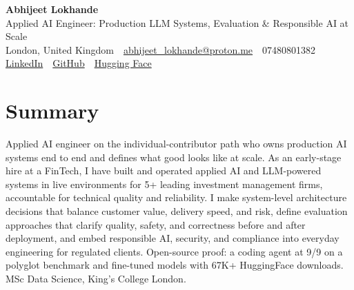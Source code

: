 \documentclass[10pt,a4paper]{article}
\newcommand{\sep}{\,\textcolor{accent!60}{\textbar}\,}
\begin{document}
\begin{center}
  {\fontsize{24}{26}\selectfont\bfseries Abhijeet Lokhande}\\[3pt]
  {\color{accent}\large Applied AI Engineer: Production LLM Systems, Evaluation \& Responsible AI at Scale}\\[5pt]
  {\small
    London, United Kingdom \sep
    \href{mailto:abhijeet_lokhande@proton.me}{abhijeet\_lokhande@proton.me} \sep
    07480801382 \\[2pt]
    \href{https://www.linkedin.com/in/ablds/}{LinkedIn} \sep
    \href{https://github.com/abhijeetscode}{GitHub} \sep
    \href{https://huggingface.co/ab-ai}{Hugging Face}
  }
\end{center}
\vspace{2pt}

\section{Summary}
Applied AI engineer on the individual-contributor path who owns production AI systems end to end and defines what good looks like at scale. As an early-stage hire at a FinTech, I have built and operated applied AI and LLM-powered systems in live environments for 5+ leading investment management firms, accountable for technical quality and reliability. I make system-level architecture decisions that balance customer value, delivery speed, and risk, define evaluation approaches that clarify quality, safety, and correctness before and after deployment, and embed responsible AI, security, and compliance into everyday engineering for regulated clients. Open-source proof: a coding agent at 9/9 on a polyglot benchmark and fine-tuned models with 67K+ HuggingFace downloads. MSc Data Science, King's College London.

\end{document}
